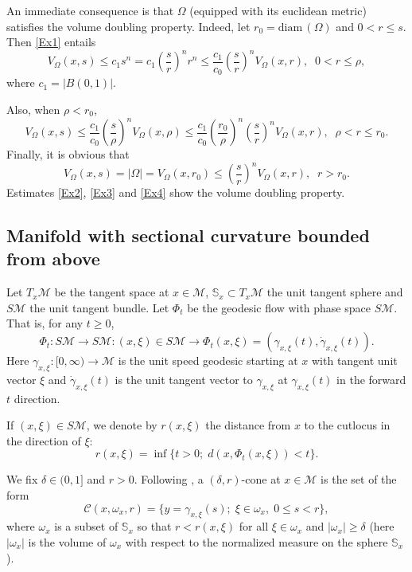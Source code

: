 \documentclass[10pt]{amsart}
\theoremstyle{definition}
\begin{document}
An immediate  consequence is that $\Omega$ (equipped with its euclidean metric) satisfies the volume doubling property.  
Indeed, let $r_0=\textrm{diam}\, (\Omega )$ and $0<r\leq s$. Then \eqref{Ex1} entails
\begin{equation}\label{Ex2}
V_\Omega (x,s)\leq c_1s^n=c_1\left( \frac{s}{r}\right)^nr^n\leq \frac{c_1}{c_0}\left( \frac{s}{r}\right)^nV_\Omega (x,r),\;\; 0<r\le \rho ,
\end{equation}
where $c_1=|B(0,1)|$.

\smallskip
Also, when $\rho <r_0$,
\begin{equation}\label{Ex3}
V_\Omega (x,s)\leq \frac{c_1}{c_0}\left( \frac{s}{\rho }\right)^nV_\Omega (x,\rho )\le \frac{c_1}{c_0}\left(\frac{r_0}{\rho}\right)^n\left( \frac{s}{r}\right)^nV_\Omega (x,r ),\;\; \rho <r\le r_0.
\end{equation}
Finally, it is obvious that
\begin{equation}\label{Ex4}
V_\Omega (x,s)=|\Omega |=V_\Omega (x,r_0)\leq \left(\frac{s}{r}\right)^n V_\Omega (x,r ),\;\; r>r_0.
\end{equation}
Estimates \eqref{Ex2}, \eqref{Ex3} and \eqref{Ex4} show the volume doubling property. 

\subsection*{Manifold with sectional curvature bounded from above}

Let $T_x\mathcal{M}$ be the tangent space at $x\in \mathcal{M}$, $\mathbb{S}_x\subset T_x\mathcal{M}$ the unit tangent sphere and $S\mathcal{M}$ the unit tangent bundle. Let $\Phi_t$ be the geodesic flow with phase space $S\mathcal{M}$. That is, for any $t\geq 0$, 
\[
\Phi_t:S\mathcal{M}\rightarrow S\mathcal{M}: (x,\xi )\in S\mathcal{M} \rightarrow\Phi_t (x,\xi )=\left( \gamma_{x,\xi }(t),\dot{\gamma}_{x,\xi }(t)\right).
\]
Here $\gamma_{x,\xi}:[0,\infty )\rightarrow \mathcal{M}$ is the unit speed geodesic starting at $x$ with tangent unit vector $\xi$ and $\dot{\gamma}_{x,\xi}(t)$ is the unit tangent vector to $\gamma_{x,\xi}$ at $\gamma_{x,\xi}(t)$ in the forward $t$ direction.

\smallskip
If $(x,\xi)\in S\mathcal{M}$, we denote by $r(x,\xi)$ the distance from $x$ to the cutlocus in the direction of $\xi$:
\[
r(x,\xi )=\inf\{t>0;\; d(x,\Phi_t(x,\xi ))<t\}.
\]

We fix $\delta \in (0,1]$ and $r>0$.  Following \cite{Sa}, a $(\delta ,r)$-cone at $x\in \mathcal{M}$ is the set of the form
\[
\mathscr{C}(x,\omega _x,r)=\{ y=\gamma_{x,\xi}(s);\; \xi\in \omega _x,\; 0\leq s<r\},
\]
where $\omega _x$ is a subset of $\mathbb{S}_x$ so that $r<r(x,\xi )$ for all $\xi \in \omega_x$ and $|\omega _x |\geq \delta$ (here $|\omega _x|$ is the volume of $\omega _x$ with respect to the normalized measure on the sphere $\mathbb{S}_x$).
\end{document}
